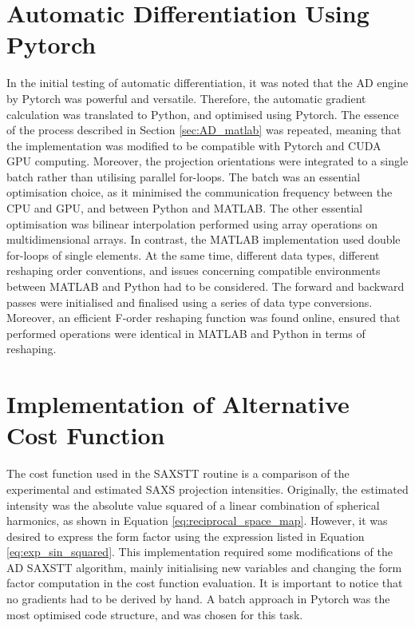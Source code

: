 \section{Automatic Differentiation Using Pytorch}\label{sec:AD_pytorch}

In the initial testing of automatic differentiation, it was noted that the AD engine by Pytorch was powerful and versatile.
Therefore, the automatic gradient calculation was translated to Python, and optimised using Pytorch.
The essence of the process described in Section \ref{sec:AD_matlab} was repeated,
meaning that the implementation was modified to be compatible with Pytorch and CUDA GPU computing.
Moreover, the projection orientations were integrated to a single batch rather than utilising parallel for-loops.
The batch was an essential optimisation choice, as it minimised the communication frequency between the CPU and GPU, and between Python and MATLAB.
The other essential optimisation was bilinear interpolation performed using array operations on multidimensional arrays.
In contrast, the MATLAB implementation used double for-loops of single elements.
At the same time, different data types, different reshaping order conventions, and issues concerning compatible environments between MATLAB and Python had to be considered.
The forward and backward passes were initialised and finalised using a series of data type conversions.
Moreover, an efficient F-order reshaping function was found online, ensured that performed operations were identical in MATLAB and Python in terms of reshaping.

\section{Implementation of Alternative Cost Function}\label{sec:alternative_cost_function}

The cost function used in the SAXSTT routine is a comparison of the experimental and estimated SAXS projection intensities.
Originally, the estimated intensity was the absolute value squared of a linear combination of spherical harmonics, as shown in Equation \eqref{eq:reciprocal_space_map}.
However, it was desired to express the form factor using the expression listed in Equation \eqref{eq:exp_sin_squared}.
This implementation required some modifications of the AD SAXSTT algorithm, mainly initialising new variables and changing the form factor computation in the cost function evaluation.
It is important to notice that no gradients had to be derived by hand.
A batch approach in Pytorch was the most optimised code structure, and was chosen for this task.

